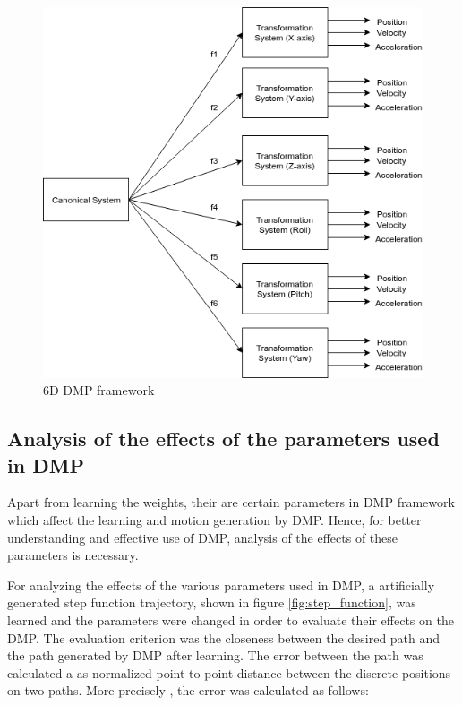 \begin{figure}[H]
	\includegraphics[width=\textwidth]{images/DMP_6DOF.png}
	\caption{6D DMP framework}
	\label{fig:DMP_6DOF}
\end{figure}



\newpage
\subsection{Analysis of the effects of the parameters used in DMP}\label{analysis}
Apart from learning the weights, their are certain parameters in DMP framework which affect the learning and motion generation by DMP. Hence, for better understanding and effective use of DMP, analysis of the effects of these parameters is necessary. 

For analyzing the effects of the various parameters used in DMP, a artificially generated step function trajectory, shown in figure \ref{fig:step_function}, was learned and the parameters were changed in order to evaluate their effects on the DMP. The evaluation criterion was the closeness between the desired path and the path generated by DMP after learning. The error between the path was calculated a as normalized point-to-point distance between the discrete positions on two paths. More precisely , the error was calculated as follows:

